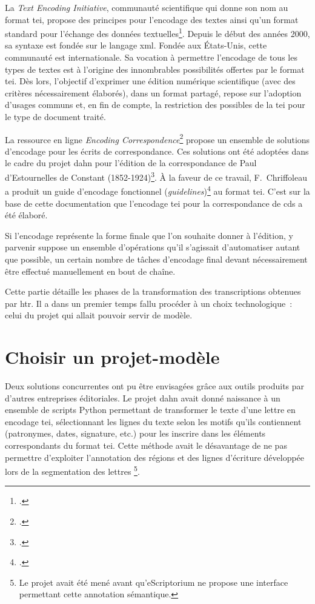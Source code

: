 \documentclass[a4paper,12pt,twoside]{book}
\begin{document}
		La \textit{Text Encoding Initiative}, communauté scientifique qui donne son nom au format \gls{tei}, propose des principes pour l'encodage des textes ainsi qu'un format standard pour l'échange des données textuelles\footcite{TEITextEncoding}. Depuis le début des années 2000, sa syntaxe est fondée sur le langage \gls{xml}. Fondée aux États-Unis, cette communauté est internationale. Sa vocation à permettre l'encodage de tous les types de textes est à l'origine des innombrables possibilités offertes par le format \gls{tei}. Dès lors, l'objectif d'exprimer une édition numérique scientifique (avec des critères nécessairement élaborés), dans un format partagé, repose sur l'adoption d'usages communs et, en fin de compte, la restriction des possibles de la \gls{tei} pour le type de document traité. 
		
		La ressource en ligne \textit{Encoding Correspondence}\footcite{dumontEncodingCorrespondenceManual2019} propose un ensemble de solutions d'encodage pour les écrits de correspondance. Ces solutions ont été adoptées dans le cadre du projet \gls{dahn} pour l'édition de la correspondance de Paul d’Estournelles de Constant (1852-1924)\footcite{chiffoleauEncodingXMLTree2020}. À la faveur de ce travail, F.~Chriffoleau a produit un guide d'encodage fonctionnel (\textit{guidelines})\footcite{chiffoleauCorrespondenceGuidelines2022} au format \gls{tei}. C'est sur la base de cette documentation que l'encodage \gls{tei} pour la correspondance de \gls{cds} a été élaboré.
		
		Si l'encodage représente la forme finale que l'on souhaite donner à l'édition, y parvenir suppose un ensemble d'opérations qu'il s'agissait d'automatiser autant que possible, un certain nombre de tâches d'encodage final devant nécessairement être effectué manuellement en bout de chaîne.
		
		Cette partie détaille les phases de la transformation des transcriptions obtenues par \gls{htr}. Il a dans un premier temps fallu procéder à un choix technologique~: celui du projet qui allait pouvoir servir de modèle.
		
		\section{Choisir un projet-modèle}
			
			Deux solutions concurrentes ont pu être envisagées grâce aux outils produits par d'autres entreprises éditoriales. Le projet \gls{dahn} avait donné naissance à un ensemble de scripts Python permettant de transformer le texte d'une lettre en encodage \gls{tei}, sélectionnant les lignes du texte selon les motifs qu'ils contiennent (patronymes, dates, signature, etc.) pour les inscrire dans les éléments correspondants du format \gls{tei}. Cette méthode avait le désavantage de ne pas permettre d'exploiter l'annotation des régions et des lignes d'écriture développée lors de la {segmentation} des lettres
			\footnote{Le projet avait été mené avant qu'eScriptorium ne propose une interface permettant cette annotation sémantique.}.
			
\end{document}
